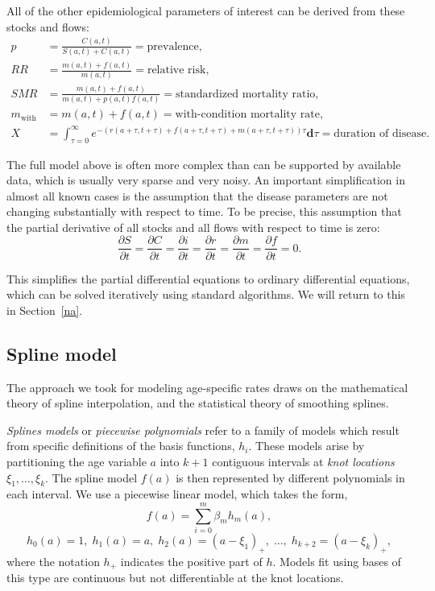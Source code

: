 \documentclass[12pt]{article}
\newcommand{\1}{\mathbf{1}}
\newcommand{\0}{\mathbf{0}}
\renewcommand{\d}{\mathbf{d}}
\newcommand{\with}{\text{with}}
\begin{document}
All of the other epidemiological parameters of interest can be derived from these stocks and flows:
\begin{align*}
p &= \frac{C(a,t)}{S(a,t)+C(a,t)} = \text{prevalence},\\
RR &= \frac{m(a,t)+f(a,t)}{m(a,t)} = \text{relative risk},\\
SMR &= \frac{m(a,t)+f(a,t)}{m(a,t)+p(a,t)f(a,t)} = \text{standardized mortality ratio},\\
m_\with &= m(a,t)+f(a,t) = \text{with-condition mortality rate},\\
X &= \int_{\tau = 0}^\infty e^{-\left(r(a+\tau, t+\tau) + f(a+\tau, t+\tau) + m(a+\tau, t+\tau)\right) \tau}\d \tau
= \text{duration of disease}.
\end{align*}

The full model above is often more complex than can be supported by
available data, which is usually very sparse and very noisy.  An
important simplification in almost all known cases is the assumption
that the disease parameters are not changing substantially with
respect to time. To be precise, this assumption that the partial
derivative of all stocks and all flows with respect to time is zero:
\[
\frac{\partial S}{\partial t}
=
\frac{\partial C}{\partial t}
=
\frac{\partial i}{\partial t}
=
\frac{\partial r}{\partial t}
=
\frac{\partial m}{\partial t}
=
\frac{\partial f}{\partial t}
=
0.
\]

This simplifies the partial differential equations to ordinary
differential equations, which can be solved iteratively using standard
algorithms.  We will return to this in Section~\ref{na}.

\subsection{Spline model}

The approach we took for modeling age-specific rates draws
on the mathematical theory of spline interpolation, and the
statistical theory of smoothing splines.

\emph{Splines models} or \emph{piecewise polynomials} refer to a
family of models which result from specific definitions of the basis
functions, $h_i$. These models arise by partitioning the age variable $a$
into $k+1$ contiguous intervals at \emph{knot locations} $\xi_1,
\dots, \xi_{k}$. The spline model $f(a)$ is then represented by different
polynomials in each interval.  We use
a piecewise linear model, which takes the form,
\[
f(a) = \sum_{i=0}^m\beta_m h_m(a),
\]
\[
h_0(a) = 1,\; h_1(a) = a,\; h_2(a) = (a-\xi_1)_+,\; \dots,\; h_{k+2}=(a-\xi_k)_+,
\]
where the notation $h_+$ indicates the positive part of $h$. Models
fit using bases of this type are continuous but not differentiable at
the knot locations.
\end{document}
